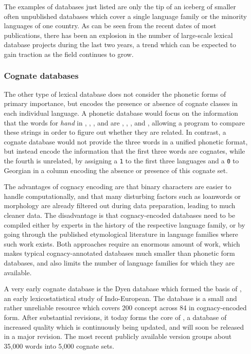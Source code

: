 The examples of databases just listed are only the tip of an iceberg of smaller often unpublished databases which cover a single language family or the minority languages of one country. As can be seen from the recent dates of most publications, there has been an explosion in the number of large-scale lexical database projects during the last two years, a trend which can be expected to gain traction as the field continues to grow.

\subsubsection{Cognate databases}
The other type of lexical database does not consider the phonetic forms of primary importance, but encodes the presence or absence of cognate classes in each individual language. A phonetic database would focus on the information that the words for \textit{hand} in , , , and  are 
\UIPA{[d ͡z]εrkʰ]}, 
\UIPA{[dɔɾə]},
\UIPA{[çeɾi]}, and
\UIPA{[χεlɪ]}, 
allowing a program to compare these strings in order to figure out whether they are related. In contrast, a cognate database would not provide the three words in a unified phonetic format, but instead encode the information that the first three words are cognates, while the fourth is unrelated, by assigning a \texttt{1} to the first three languages  and a \texttt{0} to Georgian in a column encoding the absence or presence of this cognate set.

The advantages of cognacy encoding are that binary characters are easier to handle computationally, and that many disturbing factors such as loanwords or morphology are already filtered out during data preparation, leading to much cleaner data. The disadvantage is that cognacy-encoded databases need to be compiled either by experts in the history of the respective language family, or by going through the published etymological literature in language families where such work exists. Both approaches require an enormous amount of work, which makes typical cognacy-annotated databases much smaller than phonetic form databases, and also limits the number of language families for which they are available.

A very early cognate database is the Dyen database which formed the basis of \citet{dyen_ea_1992}, an early lexicostatistical study of Indo-European. The database is a small and rather unreliable resource \citep{geisler_list_2010} which covers 200 concept across 84  in cognacy-encoded form. After substantial revisions, it today forms the core of  \citep{ielex}, a database of increased quality which is continuously being updated, and will soon be released in a major revision. The most recent publicly available version groups about 35,000 words into 5,000 cognate sets.

